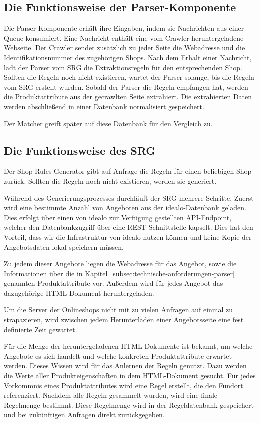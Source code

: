 \subsection{Die Funktionsweise der Parser-Komponente}
\label{subsec:funktionsweise-parser}

Die Parser-Komponente erhält ihre Eingaben, indem sie Nachrichten aus einer Queue konsumiert.
Eine Nachricht enthält eine vom Crawler heruntergeladene Webseite.
Der Crawler sendet zusätzlich zu jeder Seite die Webadresse und die Identifikationsnummer des zugehörigen Shops.
Nach dem Erhalt einer Nachricht, lädt der Parser vom SRG die Extraktionsregeln für den entsprechenden Shop.
Sollten die Regeln noch nicht existieren, wartet der Parser solange, bis die Regeln vom SRG erstellt wurden.
Sobald der Parser die Regeln empfangen hat, werden die Produktattribute aus der gecrawlten Seite extrahiert.
Die extrahierten Daten werden abschließend in einer Datenbank normalisiert gespeichert.

Der Matcher greift später auf diese Datenbank für den Vergleich zu.

\subsection{Die Funktionsweise des SRG}
\label{subsec:funktionsweise-srg}

Der Shop Rules Generator gibt auf Anfrage die Regeln für einen beliebigen Shop zurück.
Sollten die Regeln noch nicht existieren, werden sie generiert.

Während des Generierungsprozesses durchläuft der SRG mehrere Schritte.
Zuerst wird eine bestimmte Anzahl von Angeboten aus der idealo-Datenbank geladen.
Dies erfolgt über einen von idealo zur Verfügung gestellten API-Endpoint, welcher den Datenbankzugriff über eine
REST-Schnittstelle kapselt.
Dies hat den Vorteil, dass wir die Infrastruktur von idealo nutzen können und keine Kopie der Angebotsdaten
lokal speichern müssen.

Zu jedem dieser Angebote liegen die Webadresse für das Angebot, sowie die  Informationen über die in
Kapitel~\ref{subsec:technische-anforderungen-parser} genannten Produktattribute vor.
Außerdem wird für jedes Angebot das dazugehörige HTML-Dokument heruntergeladen.

Um die Server der Onlineshops nicht mit zu vielen Anfragen auf einmal zu strapazieren, wird zwischen jedem
Herunterladen einer Angebotsseite eine fest definierte Zeit gewartet.

Für die Menge der heruntergeladenen HTML-Dokumente ist bekannt, um welche Angebote es sich handelt und welche
konkreten Produktattribute erwartet werden.
Dieses Wissen wird für das Anlernen der Regeln genutzt.
Dazu werden die Werte aller Produkteigenschaften in dem HTML-Dokument gesucht.
Für jedes Vorkommnis eines Produktattributes wird eine Regel erstellt, die den Fundort referenziert.
Nachdem alle Regeln gesammelt wurden, wird eine finale Regelmenge bestimmt.
Diese Regelmenge wird in der Regeldatenbank gespeichert und bei zukünftigen Anfragen direkt zurückgegeben.

